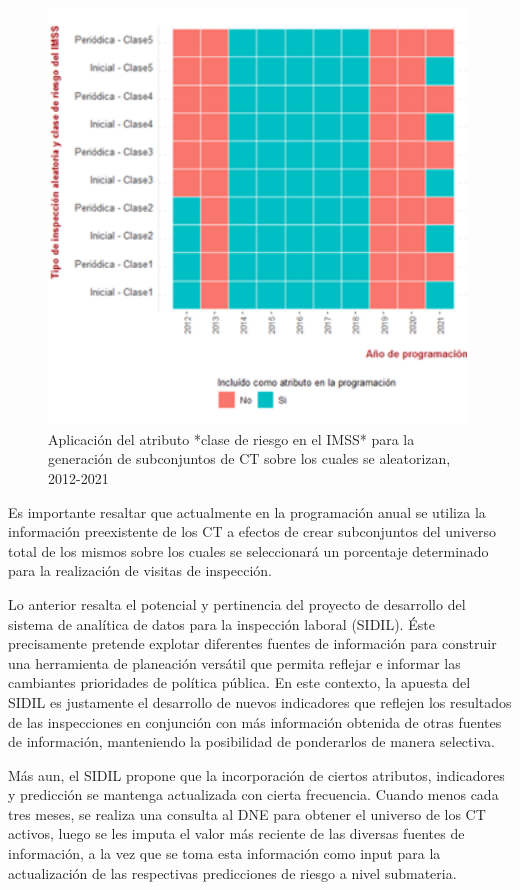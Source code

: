 \documentclass[
]{article}
\begin{document}
\begin{figure}
\includegraphics[width=4.36in]{images-1/08/tetrisprogramacion} \caption{Aplicación del  atributo *clase de riesgo en el IMSS* para la generación de subconjuntos de CT sobre los cuales se aleatorizan, 2012-2021}\label{fig:tetrisprogramacion}
\end{figure}

Es importante resaltar que actualmente en la programación anual se utiliza la información preexistente de los CT a efectos de crear subconjuntos del universo total de los mismos sobre los cuales se seleccionará un porcentaje determinado para la realización de visitas de inspección.

Lo anterior resalta el potencial y pertinencia del proyecto de desarrollo del sistema de analítica de datos para la inspección laboral (SIDIL). Éste precisamente pretende explotar diferentes fuentes de información para construir una herramienta de planeación versátil que permita reflejar e informar las cambiantes prioridades de política pública. En este contexto, la apuesta del SIDIL es justamente el desarrollo de nuevos indicadores que reflejen los resultados de las inspecciones en conjunción con más información obtenida de otras fuentes de información, manteniendo la posibilidad de ponderarlos de manera selectiva.

Más aun, el SIDIL propone que la incorporación de ciertos atributos, indicadores y predicción se mantenga actualizada con cierta frecuencia. Cuando menos cada tres meses, se realiza una consulta al DNE para obtener el universo de los CT activos, luego se les imputa el valor más reciente de las diversas fuentes de información, a la vez que se toma esta información como input para la actualización de las respectivas predicciones de riesgo a nivel submateria.
\end{document}
